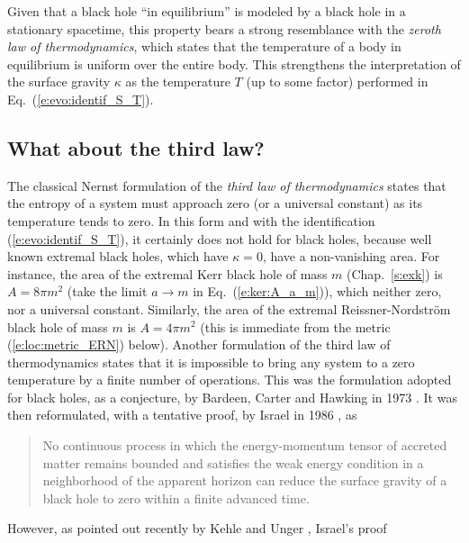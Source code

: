 Given that a black hole ``in equilibrium'' is modeled by a black hole in
a stationary spacetime,
this property bears a strong resemblance with
the \emph{zeroth law of thermodynamics}, which states that the temperature of a body in equilibrium
is uniform over the entire body.
This strengthens the interpretation of the surface gravity
$\kappa$ as the temperature $T$ (up to some factor) performed in
Eq.~(\ref{e:evo:identif_S_T}).


\subsection{What about the third law?}

The classical Nernst formulation of the \emph{third law of thermodynamics}
states that the entropy of a system must approach zero (or a universal constant)
as its temperature tends to zero. In this form and with the identification (\ref{e:evo:identif_S_T}), it certainly does not hold for black holes, because
well known extremal black holes, which have $\kappa=0$, have a non-vanishing area. For
instance, the area of the extremal Kerr black hole of mass $m$ (Chap.~\ref{s:exk}) is
$A = 8\pi m^2$ (take the limit $a\to m$ in Eq.~(\ref{e:ker:A_a_m})),
which neither zero, nor a universal constant. Similarly, the area of
the extremal Reissner-Nordström black hole of mass $m$ is $A = 4\pi m^2$
(this is immediate from the metric (\ref{e:loc:metric_ERN}) below).
Another formulation of the third law of thermodynamics states that it is impossible to bring any
system to a zero temperature by a finite number of operations. This was the formulation adopted
for black holes, as a conjecture, by Bardeen, Carter and Hawking in 1973 \cite{BardeCH73}.
It was then reformulated, with a tentative proof, by Israel in 1986 \cite{Israe86b}, as
\begin{quote}
No continuous process in which the energy-momentum tensor of accreted matter remains
bounded and satisfies the weak energy
condition in a neighborhood of the apparent
horizon can reduce the surface gravity of a black hole to zero
within a finite advanced time.
\end{quote}
However, as pointed out recently by Kehle and Unger \cite{KehleU23}, Israel's proof
